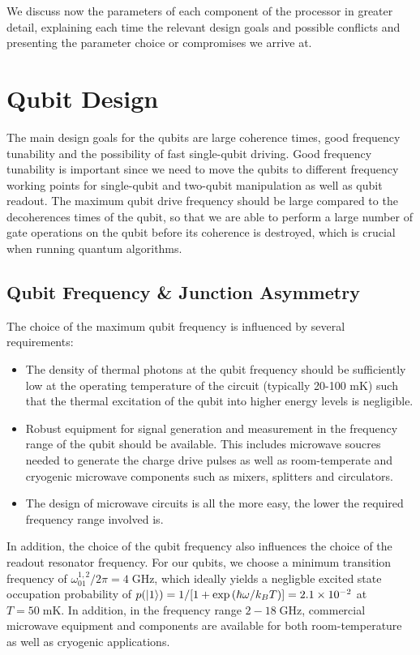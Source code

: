 \smallskip

We discuss now the parameters of each component of the processor in greater detail, explaining each time the relevant design goals and possible conflicts and presenting the parameter choice or compromises we arrive at.

\section{Qubit Design}

The main design goals for the qubits are large coherence times, good frequency tunability and the possibility of fast single-qubit driving. Good frequency tunability is important since we need to move the qubits to different frequency working points for single-qubit and two-qubit manipulation as well as qubit readout. The maximum qubit drive frequency should be large compared to the decoherences times of the qubit, so that we are able to perform a large number of gate operations on the qubit before its coherence is destroyed, which is crucial when running quantum algorithms.

\subsection{Qubit Frequency \& Junction Asymmetry}

The choice of the maximum qubit frequency is influenced by several requirements:

\begin{itemize}
\item The density of thermal photons at the qubit frequency should be sufficiently low at the operating temperature of the circuit (typically 20-100 mK) such that the thermal excitation of the qubit into higher energy levels is negligible.
\item Robust equipment for signal generation and measurement in the frequency range of the qubit should be available. This includes microwave soucres needed to generate the charge drive pulses as well as room-temperate and cryogenic microwave components such as mixers, splitters and circulators.
\item The design of microwave circuits is all the more easy, the lower the required frequency range involved is.
\end{itemize}

In addition, the choice of the qubit frequency also influences the choice of the readout resonator frequency. For our qubits, we choose a minimum transition frequency of $\omega_{01}^{1,2}/2\pi= 4 \;\mathrm{GHz}$, which ideally yields a negligble excited state occupation probability of $p(\left| 1 \right>)=1/[1+\exp{(\hbar \omega / k_B T)}]=2.1\times 10^{-2}$ at $T=50\;\mathrm{mK}$. In addition, in the frequency range $2-18\;\mathrm{GHz}$, commercial microwave equipment and components are available for both room-temperature as well as cryogenic applications.

